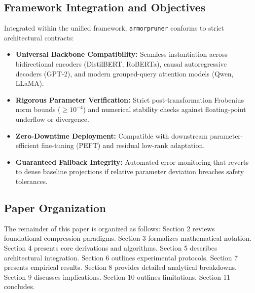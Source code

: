 \subsection{Framework Integration and Objectives}
Integrated within the unified framework, \texttt{armorpruner} conforms to strict architectural contracts:
\begin{itemize}
\item \textbf{Universal Backbone Compatibility:} Seamless instantiation across bidirectional encoders (DistilBERT, RoBERTa), causal autoregressive decoders (GPT-2), and modern grouped-query attention models (Qwen, LLaMA).
\item \textbf{Rigorous Parameter Verification:} Strict post-transformation Frobenius norm bounds ($\ge 10^{-4}$) and numerical stability checks against floating-point underflow or divergence.
\item \textbf{Zero-Downtime Deployment:} Compatible with downstream parameter-efficient fine-tuning (PEFT) and residual low-rank adaptation.
\item \textbf{Guaranteed Fallback Integrity:} Automated error monitoring that reverts to dense baseline projections if relative parameter deviation breaches safety tolerances.
\end{itemize}

\subsection{Paper Organization}
The remainder of this paper is organized as follows: Section 2 reviews foundational compression paradigms. Section 3 formalizes mathematical notation. Section 4 presents core derivations and algorithms. Section 5 describes architectural integration. Section 6 outlines experimental protocols. Section 7 presents empirical results. Section 8 provides detailed analytical breakdowns. Section 9 discusses implications. Section 10 outlines limitations. Section 11 concludes.
